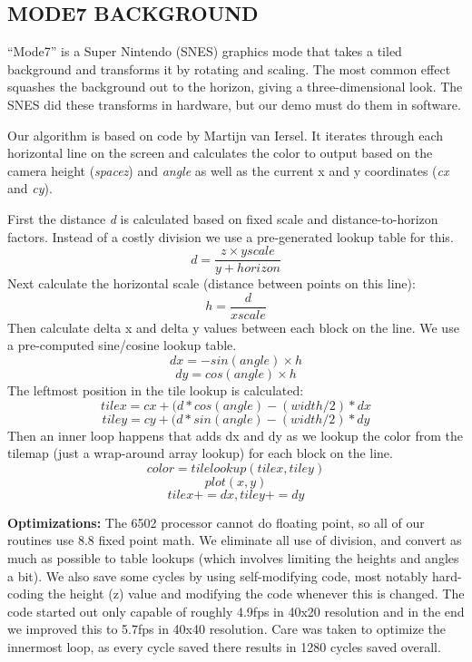 \documentclass[twocolumn]{article}
\begin{document}
\subsection{MODE7 BACKGROUND}

``Mode7'' is a Super Nintendo (SNES) graphics mode that takes a tiled
background and transforms it by rotating and scaling.
The most common effect squashes the background out to the horizon, giving
a three-dimensional look.
The SNES did these transforms in hardware, but our demo must do
them in software.

%


Our algorithm is based on code by Martijn van Iersel.
It iterates through each horizontal line on the screen and calculates the color
to output based on the camera height ({\em spacez}) and {\em angle} as well
as the current x and y coordinates ({\em cx} and {\em cy}).

First the distance {\em d} is calculated based on fixed scale and
distance-to-horizon factors.  
Instead of a costly division we use a pre-generated lookup table for this.
	\[d = \frac{z \times yscale}{y+horizon}\]
Next calculate the horizontal scale (distance between points on 
this line):
	\[h = \frac{d}{xscale}\]
Then calculate delta x and delta y values between each block on the line.
We use a pre-computed sine/cosine lookup table.
	\[dx = -sin(angle) \times h\]
	\[dy = cos(angle) \times h\]
The leftmost position in the tile lookup is calculated:
	\[tilex = cx + (d*cos(angle) - (width/2) * dx\]
	\[tiley = cy + (d*sin(angle) - (width/2) * dy\]
Then an inner loop happens that adds dx and dy as we lookup the color
from the tilemap (just a wrap-around array lookup) for each block
on the line.
	\[color = tilelookup(tilex,tiley)\]
	\[plot (x, y) \]
	\[tilex += dx, tiley+= dy\]

\noindent
{\bf Optimizations:}
The 6502 processor cannot do floating point, so all of our routines use
8.8 fixed point math.
We eliminate all use of division, and convert as much as possible
to table lookups (which involves limiting the heights and angles a bit).
We also save some cycles by using self-modifying code,
most notably hard-coding the height (z) value and modifying the code
whenever this is changed.
The code started out only capable of roughly 4.9fps in 40x20 resolution
and in the end we improved this to 5.7fps in 40x40 resolution.
Care was taken to optimize the innermost loop, as every cycle saved there
results in 1280 cycles saved overall.
\end{document}
